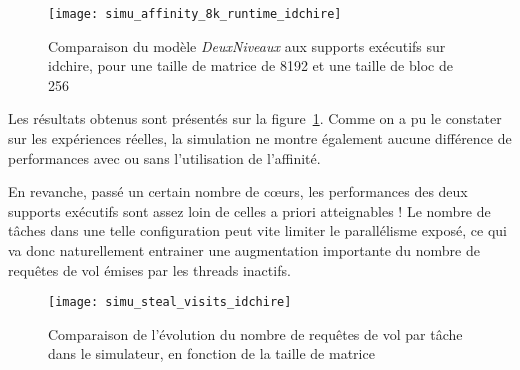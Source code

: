 \begin{figure}[h!]
  \centering
  \texttt{[image: simu\_affinity\_8k\_runtime\_idchire]}
  \caption{Comparaison du modèle \emph{DeuxNiveaux} aux supports exécutifs sur idchire, pour une taille de matrice de 8192 et une taille de bloc de 256}\label{fig:simu:affinityavg-8k-vs-runtime:idchire}
\end{figure}






Les résultats obtenus sont présentés sur la figure~\ref{fig:simu:affinityavg-8k-vs-runtime:idchire}.
Comme on a pu le constater sur les expériences réelles, la simulation ne montre également aucune différence de performances avec ou sans l'utilisation de l'affinité.

En revanche, passé un certain nombre de cœurs, les performances des deux supports exécutifs sont assez loin de celles a priori atteignables !
Le nombre de tâches dans une telle configuration peut vite limiter le parallélisme exposé, ce qui va donc naturellement entrainer une augmentation importante du nombre de requêtes de vol émises par les threads inactifs.

\begin{figure}[h!]
  \centering
  \texttt{[image: simu\_steal\_visits\_idchire]}
  \caption{Comparaison de l'évolution du nombre de requêtes de vol par tâche dans le simulateur, en fonction de la taille de matrice}\label{fig:simu:steals_per_task:idchire}
\end{figure}

